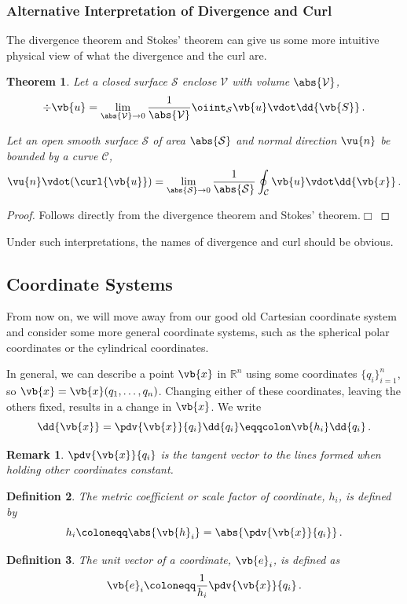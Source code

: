 \documentclass{article}
\theoremstyle{plain}\theoremheaderfont{\normalfont\itshape}\theorembodyfont{\rmfamily}\theoremseparator{.}\newtheorem*{rem}{Remark}\newtheorem*{ex}{Example}\newtheorem*{proof}{Proof}\newtheorem*{altp}{Alternative proof}
\theoremstyle{plain}\theoremheaderfont{\normalfont\bfseries}\theorembodyfont{\rmfamily}\theoremseparator{.}\newtheorem{thm}{Theorem}[section]\newtheorem{lem}[thm]{Lemma}\newtheorem{prop}[thm]{Proposition}\newtheorem*{cor}{Corollary}\newtheorem{defn}[thm]{Definition}\newtheorem{clm}[thm]{Claim}\newtheorem{clminproof}{Claim}
\theoremstyle{break}\theoremheaderfont{\normalfont\itshape}\theorembodyfont{\rmfamily}\theoremseparator{.\medskip}\newtheorem*{proofskip}{Proof}\newtheorem*{exs}{Examples}\newtheorem*{rems}{Remarks}
\theoremstyle{break}\theoremheaderfont{\normalfont\bfseries}\theorembodyfont{\rmfamily}\theoremseparator{.\medskip}\newtheorem{lemskip}[thm]{Lemma}\newtheorem{defnskip}[thm]{Definition}\newtheorem{propskip}[thm]{Proposition}\newtheorem{thmskip}[thm]{Theorem}
\numberwithin{equation}{section}
\newcommand{\qed}{\hfill\ensuremath{\Box}}
\begin{document}
	\subsubsection{Alternative Interpretation of Divergence and Curl}
	The divergence theorem and Stokes' theorem can give us some more intuitive physical view of what the divergence and the curl are.
	\begin{thm}\label{altdivcurl}
		Let a closed surface \(\mathcal{S}\) enclose \(\mathcal{V}\) with volume \(\abs{\mathcal{V}}\),
		\[\div{\vb{u}}=\lim_{\abs{\mathcal{V}}\to 0}\frac{1}{\abs{\mathcal{V}}}\oiint_{\mathcal{S}}\vb{u}\vdot\dd{\vb{S}}\,.\]
	
		Let an open smooth surface \(\mathcal{S}\) of area \(\abs{\mathcal{S}}\) and normal direction \(\vu{n}\) be bounded by a curve \(\mathcal{C}\),
		\[\vu{n}\vdot(\curl{\vb{u}})=\lim_{\abs{\mathcal{S}}\to 0}\frac{1}{\abs{\mathcal{S}}}\oint_{\mathcal{C}}\vb{u}\vdot\dd{\vb{x}}\,.\]
	\end{thm}
	\begin{proof}
		Follows directly from the divergence theorem and Stokes' theorem.\qed
	\end{proof}
	Under such interpretations, the names of divergence and curl should be obvious.

	\subsection{Coordinate Systems}
	From now on, we will move away from our good old Cartesian coordinate system and consider some more general coordinate systems, such as the spherical polar coordinates or the cylindrical coordinates.

	In general, we can describe a point \(\vb{x}\) in \(\mathbb{R}^n\) using some coordinates \(\{q_i\}_{i=1}^{n}\), so \(\vb{x}=\vb{x}(q_1,\dots,q_n)\). Changing either of these coordinates, leaving the others fixed, results in a change in \(\vb{x}\). We write
	\[\dd{\vb{x}}=\pdv{\vb{x}}{q_i}\dd{q_i}\eqqcolon \vb{h_i}\dd{q_i}\,.\]
	\begin{rem}
		\(\pdv{\vb{x}}{q_i}\) is the tangent vector to the lines formed when holding other coordinates constant.
	\end{rem}
	\begin{defn}
		The \textit{metric coefficient} or \textit{scale factor} of coordinate, \(h_i\), is defined by
		\[h_i\coloneqq\abs{\vb{h}_i}=\abs{\pdv{\vb{x}}{q_i}}\,.\]
	\end{defn}
	\begin{defn}
		The \textit{unit vector} of a coordinate, \(\vb{e}_i\), is defined as
		\[\vb{e}_i\coloneqq\frac{1}{h_i}\pdv{\vb{x}}{q_i}\,.\]
	\end{defn}
\end{document}
